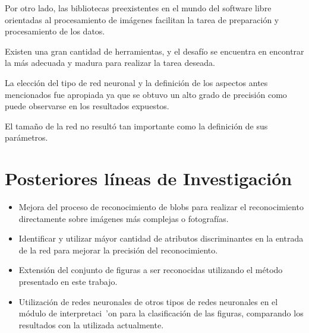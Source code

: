 \documentclass[pdftex,a4paper,10.5pt]{article}
\begin{document}
	Por otro lado, las bibliotecas preexistentes en el mundo del software libre orientadas
	al procesamiento de im\'agenes facilitan la tarea de preparaci\'on y procesamiento 
	de los datos.

	Existen una gran cantidad de herramientas, y el desaf\'io se encuentra en encontrar
	la m\'as adecuada y madura para realizar la tarea deseada.

	La elecci\'on del tipo de red neuronal y la definici\'on de los aspectos antes mencionados
	fue apropiada ya que se obtuvo un alto grado de precisi\'on como puede observarse
	en los resultados expuestos.
	
	El tama\~no de la red no result\'o tan importante como la definici\'on de sus par\'ametros.

\section{Posteriores l\'ineas de Investigaci\'on} %

\begin{itemize}
\item 	Mejora del proceso de reconocimiento de blobs para realizar el reconocimiento directamente sobre im\'agenes m\'as complejas o fotograf\'ias.
\item 	Identificar y utilizar m\'ayor cantidad de atributos discriminantes en la entrada de la red para mejorar la precisi\'on del reconocimiento.
\item 	Extensi\'on del conjunto de figuras a ser reconocidas utilizando el m\'etodo presentado en este trabajo.
\item 	Utilizaci\'on de redes neuronales de otros tipos de redes neuronales en el m\'odulo de interpretaci\ 'on para la clasificaci\'on de las figuras, comparando los resultados con la utilizada actualmente.

\end{itemize}
\newpage
\end{document}
